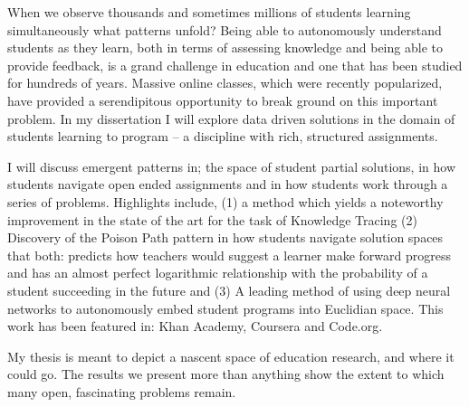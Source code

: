 When we observe thousands and sometimes millions of students learning simultaneously what patterns unfold? Being able to autonomously understand students as they learn, both in terms of assessing knowledge and being able to provide feedback, is a grand challenge in education and one that has been studied for hundreds of years. Massive online classes, which were recently popularized, have provided a serendipitous opportunity to break ground on this important problem. In my dissertation I will explore data driven solutions in the domain of students learning to program -- a discipline with rich, structured assignments.

I will discuss emergent patterns in; the space of student partial solutions, in how students navigate open ended assignments and in how students work through a series of problems. Highlights include, (1) a method which yields a noteworthy improvement in the state of the art for the task of Knowledge Tracing (2) Discovery of the Poison Path pattern in how students navigate solution spaces that both: predicts how teachers would suggest a learner make forward progress and has an almost perfect logarithmic relationship with the probability of a student succeeding in the future and (3) A leading method of using deep neural networks to autonomously embed student programs into Euclidian space. This work has been featured in: Khan Academy, Coursera and Code.org.

My thesis is meant to depict a nascent space of education research, and where it could go. The results we present more than anything show the extent to which many open, fascinating problems remain.